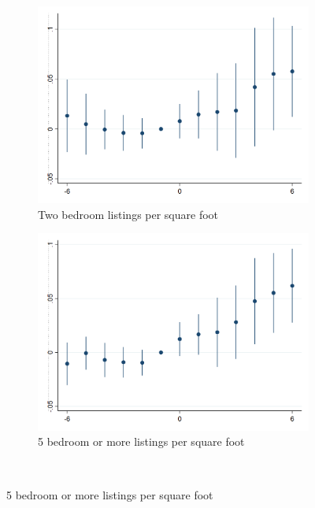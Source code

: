 \begin{figure}[h!]
\begin{subfigure}{0.5\textwidth}
        \includegraphics[width=0.95\linewidth]{analysis/event_study/output/last_rentpsqft_2br_w6.png}
        \caption{Two bedroom listings per square foot} \label{appfig:event_study_2BRpsqft}
    \end{subfigure}%
    \begin{subfigure}{0.5\textwidth} \centering
        \includegraphics[width=0.95\linewidth]{analysis/event_study/output/last_rentpsqft_mfr5plus_w6.png}
        \caption{5 bedroom or more listings per square foot} \label{appfig:event_study_5BRpsqft}
    \end{subfigure}\\
    \begin{minipage}{.95\textwidth} \footnotesize
		\vspace{2mm} 

\end{minipage}
\end{figure}
